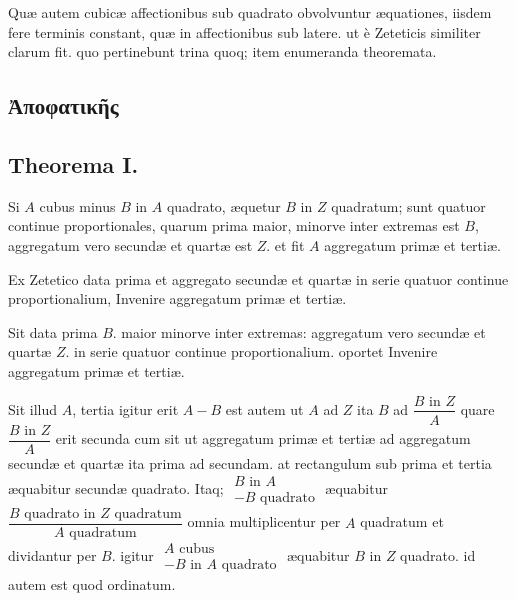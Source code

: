 \documentclass[11pt,a4paper]{article}
\begin{document}
Quæ autem cubicæ affectionibus sub quadrato obvolvuntur æquationes, iisdem fere terminis constant, quæ in affectionibus sub latere. ut è Zeteticis similiter clarum fit. quo pertinebunt trina quoq; item enumeranda theoremata.


\subsection*{Ἀποφατικῆς}

\subsection*{Theorema I.}

Si $A$ cubus minus $B$ in $A$ quadrato, æquetur $B$ in $Z$ quadratum; sunt quatuor continue proportionales, quarum prima maior, minorve inter extremas est $B$, aggregatum vero secundæ et quartæ est $Z$. et fit $A$ aggregatum primæ et tertiæ.

Ex Zetetico data prima et aggregato secundæ et quartæ in serie quatuor continue proportionalium, Invenire aggregatum primæ et tertiæ.

Sit data prima $B$. maior minorve inter extremas: aggregatum vero secundæ et quartæ $Z$. in serie quatuor continue proportionalium. oportet Invenire aggregatum primæ et tertiæ.

Sit illud $A$, tertia igitur erit $A - B$ est autem ut $A$ ad $Z$ ita $B$ ad $\dfrac{B \text{ in } Z}{A}$ quare $\dfrac{B \text{ in } Z}{A}$ erit secunda cum sit ut aggregatum primæ et tertiæ ad aggregatum secundæ et quartæ ita prima ad secundam. at rectangulum sub prima et tertia æquabitur secundæ quadrato. Itaq; $\begin{array}{l} B \text{ in } A \\ - B \text{ quadrato} \end{array}$ æquabitur $\dfrac{B \text{ quadrato in } Z \text{ quadratum}}{A \text{ quadratum}}$ omnia multiplicentur per $A$ quadratum et dividantur per $B$. igitur $\begin{array}{l} A \text{ cubus} \\ - B \text{ in } A \text{ quadrato} \end{array}$ æquabitur $B$ in $Z$ quadrato. id autem est quod ordinatum.
\end{document}
